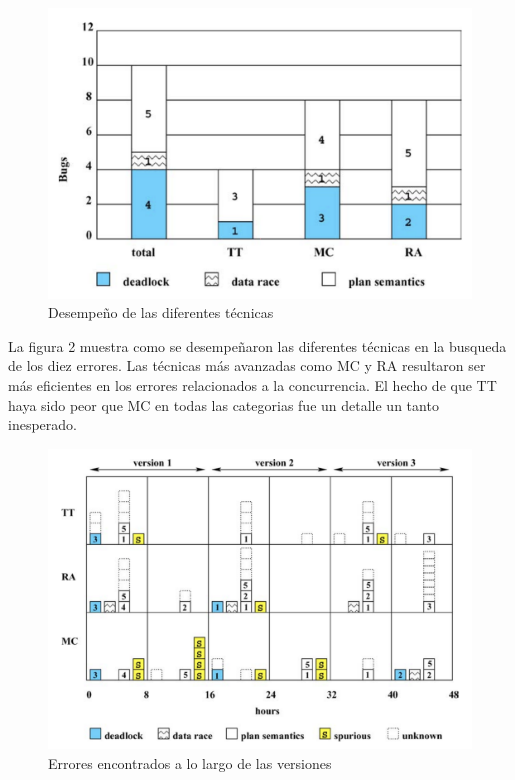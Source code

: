 \documentclass[runningheads]{llncs}
\begin{document}
\begin{figure}[H]
\centering
\includegraphics[scale=0.5]{fig2.png}
\caption{Desempe\~no de las diferentes t\'ecnicas} \label{fig2}
\end{figure}
La figura 2 muestra como se desempe\~naron las diferentes t\'ecnicas en la busqueda de los diez errores. Las t\'ecnicas m\'as avanzadas como MC y RA resultaron ser m\'as eficientes en los errores relacionados a la concurrencia. El hecho de que TT haya sido peor que MC en todas las categorias fue un detalle un tanto inesperado.\\

\begin{figure}[H]
\includegraphics[width=\textwidth]{fig3.png}
\caption{Errores encontrados a lo largo de las versiones} \label{fig3}
\end{figure}
\end{document}
